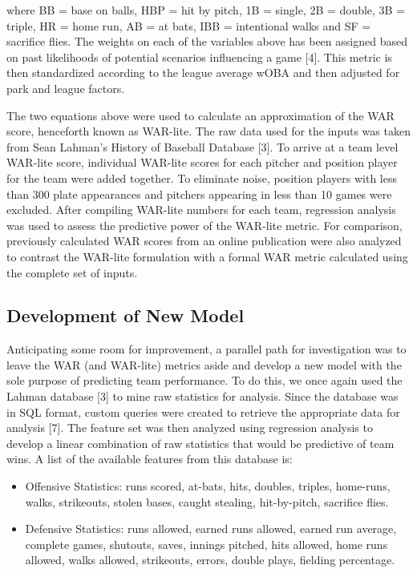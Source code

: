 \documentclass{article} %
\begin{document}
where BB = base on balls, HBP = hit by pitch, 1B = single, 2B = double, 3B = triple, HR = home run, AB = at bats, IBB = intentional walks and SF = sacrifice flies.  The weights on each of the variables above has been assigned based on past likelihoods of potential scenarios influencing a game [4].  This metric is then standardized according to the league average wOBA and then adjusted for park and league factors.

The two equations above were used to calculate an approximation of the WAR score, henceforth known as WAR-lite.  The raw data used for the inputs was taken from Sean Lahman's History of Baseball Database [3]. To arrive at a team level WAR-lite score, individual WAR-lite scores for each pitcher and position player for the team were added together.  To eliminate noise, position players with less than 300 plate appearances and pitchers appearing in less than 10 games were excluded. After compiling WAR-lite numbers for each team, regression analysis was used to assess the predictive power of the WAR-lite metric. For comparison, previously calculated WAR scores from an online publication were also analyzed to contrast the WAR-lite formulation with a formal WAR metric calculated using the complete set of inputs.

\subsection{Development of New Model} 
Anticipating some room for improvement, a parallel path for investigation was to leave the WAR (and WAR-lite) metrics aside and develop a new model with the sole purpose of predicting team performance.  To do this, we once again used the Lahman database [3] to mine raw statistics for analysis. Since the database was in SQL format, custom queries were created to retrieve the appropriate data for analysis [7].  The feature set was then analyzed using regression analysis to develop a linear combination of raw statistics that would be predictive of team wins. A list of the available features from this database is: \\
\begin{itemize}  
\item Offensive Statistics: runs scored, at-bats, hits, doubles, triples, home-runs, walks, strikeouts, stolen bases, caught stealing, hit-by-pitch, sacrifice flies. 
\item Defensive Statistics: runs allowed, earned runs allowed, earned run average, complete games, shutouts, saves, innings pitched, hits allowed, home runs allowed, walks allowed, strikeouts, errors, double plays, fielding percentage. 

\end{itemize}
\end{document}
